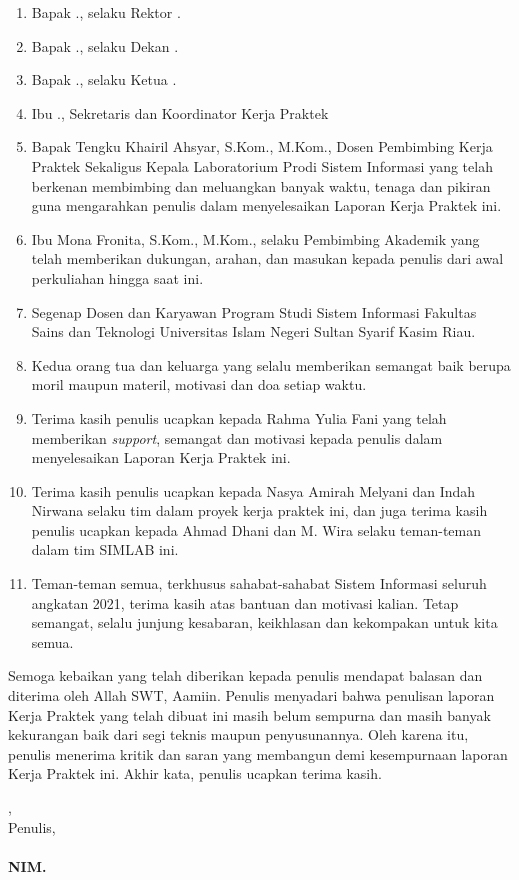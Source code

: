 \begin{enumerate}
	\item Bapak \rektor., selaku Rektor \universitas.
	\item Bapak \dekan., selaku Dekan \fakultas.
	\item Bapak \kaprodi., selaku Ketua \programStudi \space
	      \fakultas \space \universitas.
	\item Ibu \sekretarisprodi., Sekretaris dan Koordinator Kerja Praktek \programStudi \space
	      \fakultas \space \universitas
	\item Bapak Tengku Khairil Ahsyar, S.Kom., M.Kom., Dosen Pembimbing Kerja Praktek Sekaligus Kepala Laboratorium Prodi Sistem Informasi yang telah berkenan membimbing dan meluangkan banyak waktu, tenaga dan pikiran guna mengarahkan penulis dalam menyelesaikan Laporan Kerja Praktek ini.
	\item Ibu Mona Fronita, S.Kom., M.Kom., selaku Pembimbing Akademik yang telah memberikan dukungan, arahan, dan masukan kepada penulis dari awal perkuliahan hingga saat ini.
	\item Segenap Dosen dan Karyawan Program Studi Sistem Informasi Fakultas Sains dan Teknologi Universitas Islam Negeri Sultan Syarif Kasim Riau.
	\item Kedua orang tua dan keluarga yang selalu memberikan semangat baik berupa moril maupun materil, motivasi dan doa setiap waktu.
	\item Terima kasih penulis ucapkan kepada Rahma Yulia Fani yang telah memberikan \textit{support}, semangat dan motivasi kepada penulis dalam menyelesaikan Laporan Kerja Praktek ini.
	\item Terima kasih penulis ucapkan kepada Nasya Amirah Melyani dan Indah Nirwana selaku tim dalam proyek kerja praktek ini, dan juga terima kasih penulis ucapkan kepada Ahmad Dhani dan M. Wira selaku teman-teman dalam tim SIMLAB ini.
	\item Teman-teman semua, terkhusus sahabat-sahabat Sistem Informasi seluruh angkatan 2021, terima kasih atas bantuan dan motivasi kalian. Tetap semangat, selalu junjung kesabaran, keikhlasan dan kekompakan untuk kita semua.

\end{enumerate}

Semoga kebaikan yang telah diberikan kepada penulis mendapat balasan dan diterima oleh Allah SWT, Aamiin. Penulis menyadari bahwa penulisan laporan Kerja Praktek yang telah dibuat ini masih belum sempurna dan masih banyak kekurangan baik dari segi teknis maupun penyusunannya. Oleh karena itu, penulis menerima kritik dan saran yang membangun demi kesempurnaan laporan Kerja Praktek ini. Akhir kata, penulis ucapkan terima kasih.

\vspace*{0.1cm}

\begin{flushright}
	\kota, \tanggalPersetujuan\\
	Penulis,\\
	\vspace{2cm}
	\textbf{\underline{\penulis}\\
		NIM. \nim}

\end{flushright}


